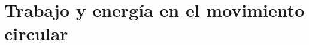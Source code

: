 \documentclass[11pt,handout,aspectratio=1610]{beamer}
\begin{document}



\section[Trabajo y energía]{Trabajo y energía en el movimiento circular}
\end{document}
